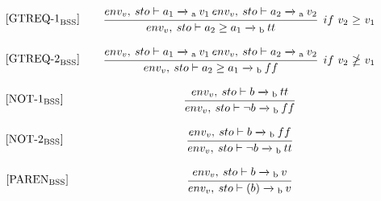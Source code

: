 \begin{equation}
\begin{minipage}{.2\linewidth}
$[\text{GTREQ-1}_\text{BSS}]$
\end{minipage}
\begin{minipage}{.8\linewidth}
\centering
$\cfrac{env_v, \: sto \vdash a_1 \xrightarrow{}\textsubscript{a} \: v_1 \: env_v, \: sto \vdash a_2 \xrightarrow{}\textsubscript{a} \: v_2}{env_v, \: sto \vdash a_2 \geq a_1 \xrightarrow{}\textsubscript{b} \: tt}$
$ \: if$ $v_2$ $\geq$ $v_1$
\end{minipage}
\end{equation}

\begin{equation}
\begin{minipage}{.2\linewidth}
$[\text{GTREQ-2}_\text{BSS}]$
\end{minipage}
\begin{minipage}{.8\linewidth}
\centering
$\cfrac{env_v, \: sto \vdash a_1 \xrightarrow{}\textsubscript{a} \: v_1 \: env_v, \: sto \vdash a_2 \xrightarrow{}\textsubscript{a} \: v_2}{env_v, \: sto \vdash a_2 \geq a_1 \xrightarrow{}\textsubscript{b} \: ff}$
$ \: if$ $v_2$ $\ngeq$ $v_1$
\end{minipage}
\end{equation}

\begin{equation}
\begin{minipage}{.2\linewidth}
$[\text{NOT-1}_\text{BSS}]$
\end{minipage}
\begin{minipage}{.8\linewidth}
\centering
$\cfrac{env_v, \: sto \vdash b \xrightarrow{}\textsubscript{b} \: tt}{env_v, \: sto \vdash \neg b \xrightarrow{}\textsubscript{b} \: ff}$
\end{minipage}
\end{equation}

\begin{equation}
\begin{minipage}{.2\linewidth}
$[\text{NOT-2}_\text{BSS}]$
\end{minipage}
\begin{minipage}{.8\linewidth}
\centering
$\cfrac{env_v, \: sto \vdash b \xrightarrow{}\textsubscript{b} \: ff}{env_v, \: sto \vdash \neg b \xrightarrow{}\textsubscript{b} \: tt}$
\end{minipage}
\end{equation}

\begin{equation}
\begin{minipage}{.2\linewidth}
$[\text{PAREN}_\text{BSS}]$
\end{minipage}
\begin{minipage}{.8\linewidth}
$\cfrac{env_v, \: sto \vdash b \xrightarrow{}\textsubscript{b} \: v}{env_v, \: sto \vdash (b) \xrightarrow{}\textsubscript{b} \: v}$
\centering
\end{minipage}
\end{equation}

